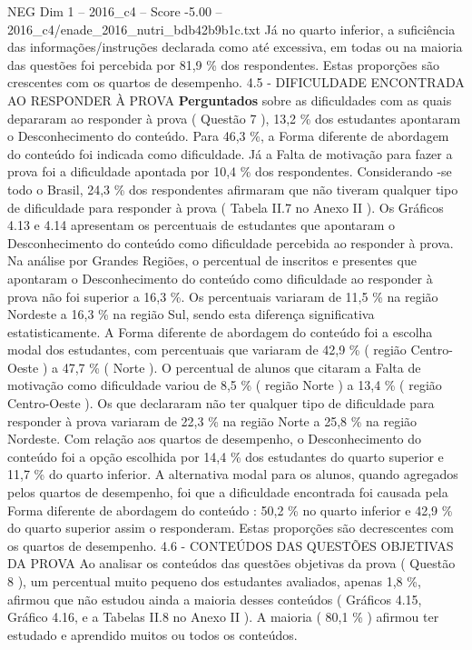 \begin{textsample}{NEG Dim 1 – 2016\_c4 – Score -5.00 – 2016\_c4/enade\_2016\_nutri\_bdb42b9b1c.txt}
Já no quarto inferior, a suficiência das informações/instruções declarada como até excessiva, em todas ou na maioria das questões foi percebida por 81,9 \% dos respondentes.
Estas proporções são crescentes com os quartos de desempenho. 4.5 - DIFICULDADE ENCONTRADA AO RESPONDER À PROVA \textbf{Perguntados} sobre as dificuldades com as quais depararam ao responder à prova ( Questão 7 ), 13,2 \% dos estudantes apontaram o Desconhecimento do conteúdo.
Para 46,3 \%, a Forma diferente de abordagem do conteúdo foi indicada como dificuldade.
Já a Falta de motivação para fazer a prova foi a dificuldade apontada por 10,4 \% dos respondentes.
Considerando -se todo o Brasil, 24,3 \% dos respondentes afirmaram que não tiveram qualquer tipo de dificuldade para responder à prova ( Tabela II.7 no Anexo II ).
Os Gráficos 4.13 e 4.14 apresentam os percentuais de estudantes que apontaram o Desconhecimento do conteúdo como dificuldade percebida ao responder à prova.
Na análise por Grandes Regiões, o percentual de inscritos e presentes que apontaram o Desconhecimento do conteúdo como dificuldade ao responder à prova não foi superior a 16,3 \%.
Os percentuais variaram de 11,5 \% na região Nordeste a 16,3 \% na região Sul, sendo esta diferença significativa estatisticamente.
A Forma diferente de abordagem do conteúdo foi a escolha modal dos estudantes, com percentuais que variaram de 42,9 \% ( região Centro-Oeste ) a 47,7 \% ( Norte ).
O percentual de alunos que citaram a Falta de motivação como dificuldade variou de 8,5 \% ( região Norte ) a 13,4 \% ( região Centro-Oeste ).
Os que declararam não ter qualquer tipo de dificuldade para responder à prova variaram de 22,3 \% na região Norte a 25,8 \% na região Nordeste.
Com relação aos quartos de desempenho, o Desconhecimento do conteúdo foi a opção escolhida por 14,4 \% dos estudantes do quarto superior e 11,7 \% do quarto inferior.
A alternativa modal para os alunos, quando agregados pelos quartos de desempenho, foi que a dificuldade encontrada foi causada pela Forma diferente de abordagem do conteúdo : 50,2 \% no quarto inferior e 42,9 \% do quarto superior assim o responderam.
Estas proporções são decrescentes com os quartos de desempenho. 4.6 - CONTEÚDOS DAS QUESTÕES OBJETIVAS DA PROVA Ao analisar os conteúdos das questões objetivas da prova ( Questão 8 ), um percentual muito pequeno dos estudantes avaliados, apenas 1,8 \%, afirmou que não estudou ainda a maioria desses conteúdos ( Gráficos 4.15, Gráfico 4.16, e a Tabelas II.8 no Anexo II ).
A maioria ( 80,1 \% ) afirmou ter estudado e aprendido muitos ou todos os conteúdos.

\end{textsample}

